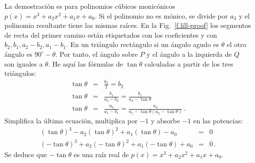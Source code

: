 La demostración es para polinomios cúbicos monicónicos $p(x)=x^3+a_2x^2+a_1x+a_0$. Si el polinomio no es mónico, se divide por $a_3$ y el polinomio resultante tiene las mismas raíces. En la Fig.~\ref{f.lill-proof} los segmentos de recta del primer camino están etiquetados con los coeficientes y con $b_2,b_1,a_2-b_2,a_1-b_1$. En un triángulo rectángulo si un ángulo agudo es $\theta$ el otro ángulo es $90^\circ-\theta$. Por tanto, el ángulo sobre $P$ y el ángulo a la izquierda de $Q$ son iguales a $\theta$. He aquí las fórmulas de $\tan \theta$ calculadas a partir de los tres triángulos:
\begin{eqnarray*}
\tan \theta &=& \frac{b_2}{1}=b_2\\
\tan \theta &=& \frac{b_1}{a_2-b_2}=\frac{b_1}{a_2-\tan\theta}\\
\tan \theta &=& \frac{a_0}{a_1-b_1}=\frac{a_0}{a_1-\tan\theta(a_2-\tan\theta)}\,.
\end{eqnarray*}
Simplifica la última ecuación, multiplica por $-1$ y absorbe $-1$ en las potencias:
\begin{eqnarray*}
(\tan\theta)^3-a_2(\tan\theta)^2+a_1(\tan\theta)-a_0&=&0\\
(-\tan\theta)^3+a_2(-\tan\theta)^2+a_1(-\tan\theta)+a_0&=&0\,.
\end{eqnarray*}
Se deduce que $-\tan\theta$ es una raíz real de $p(x)=x^3+a_2x^2+a_1x+a_0$.

